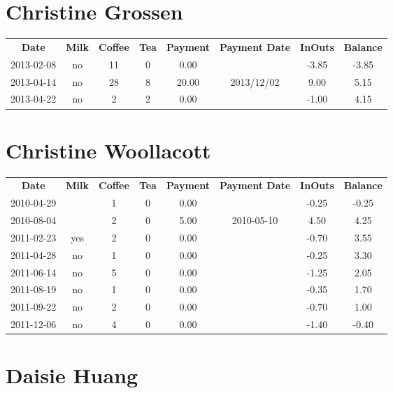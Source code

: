 \section{Christine Grossen}

\begin{center}
\begin{tabular}{cccccccc}
\textbf{Date} & \textbf{Milk} & \textbf{Coffee} & \textbf{Tea} & \textbf{Payment} & \textbf{Payment Date} & \textbf{InOuts} & \textbf{Balance} \\
2013-02-08 & no & 11 & 0 &  0.00 &  & -3.85 & -3.85\\ 
2013-04-14 & no & 28 & 8 & 20.00 & 2013/12/02 &  9.00 &  5.15\\ 
2013-04-22 & no &  2 & 2 &  0.00 &  & -1.00 &  4.15
\end{tabular}
\end{center}

\section{Christine Woollacott}

\begin{center}
\begin{tabular}{cccccccc}
\textbf{Date} & \textbf{Milk} & \textbf{Coffee} & \textbf{Tea} & \textbf{Payment} & \textbf{Payment Date} & \textbf{InOuts} & \textbf{Balance} \\
2010-04-29 &  & 1 & 0 & 0.00 &  & -0.25 & -0.25\\ 
2010-08-04 &  & 2 & 0 & 5.00 & 2010-05-10 &  4.50 &  4.25\\ 
2011-02-23 & yes & 2 & 0 & 0.00 &  & -0.70 &  3.55\\ 
2011-04-28 & no & 1 & 0 & 0.00 &  & -0.25 &  3.30\\ 
2011-06-14 & no & 5 & 0 & 0.00 &  & -1.25 &  2.05\\ 
2011-08-19 & no & 1 & 0 & 0.00 &  & -0.35 &  1.70\\ 
2011-09-22 & no & 2 & 0 & 0.00 &  & -0.70 &  1.00\\ 
2011-12-06 & no & 4 & 0 & 0.00 &  & -1.40 & -0.40
\end{tabular}
\end{center}

\section{Daisie Huang}

